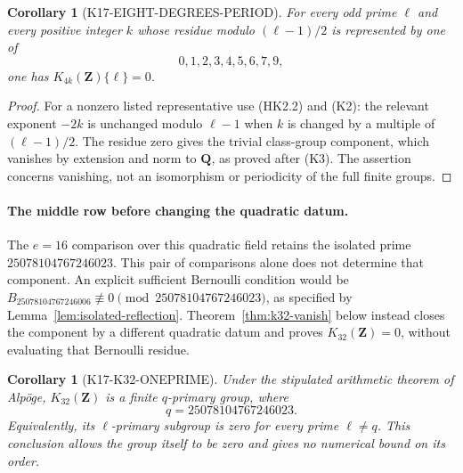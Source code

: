 \documentclass[11pt,a4paper]{article}
\newtheorem{corollary}[theorem]{Corollary}
\theoremstyle{definition}
\begin{document}
\begin{corollary}[K17-EIGHT-DEGREES-PERIOD]
\label{cor:eight-degrees-period}
For every odd prime $\ell$ and every positive integer $k$ whose residue
modulo $(\ell-1)/2$ is represented by one of
\[
                              0,1,2,3,4,5,6,7,9,
\]
one has $K_{4k}(\mathbf Z)\{\ell\}=0$.
\end{corollary}

\begin{proof}
For a nonzero listed representative use (HK2.2) and (K2):
the relevant exponent $-2k$ is unchanged modulo $\ell-1$ when $k$
is changed by a multiple of $(\ell-1)/2$.
The residue zero gives the trivial class-group component, which
vanishes by extension and norm to $\mathbf Q$, as proved after (K3).
The assertion concerns vanishing, not an isomorphism or periodicity
of the full finite groups.
\end{proof}

\paragraph{The middle row before changing the quadratic datum.}
The $e=16$ comparison over this quadratic field retains the isolated prime
$25078104767246023$.
This pair of comparisons alone does not determine that component.
An explicit sufficient Bernoulli condition would be
$B_{25078104767246006}\not\equiv0
 \pmod{25078104767246023}$, as specified by
Lemma~\ref{lem:isolated-reflection}. Theorem~\ref{thm:k32-vanish}
below instead closes the component by a different quadratic datum
and proves $K_{32}(\mathbf Z)=0$, without evaluating that Bernoulli
residue.

\begin{corollary}[K17-K32-ONEPRIME]\label{cor:k32-oneprime}
Under the stipulated arithmetic theorem of Alp\"oge,
$K_{32}(\mathbf Z)$ is a finite $q$-primary group, where
\[
                             q=25078104767246023.
\]
Equivalently, its $\ell$-primary subgroup is zero for every prime
$\ell\ne q$. This conclusion allows the group itself to be zero
and gives no numerical bound on its order.
\end{corollary}
\end{document}
